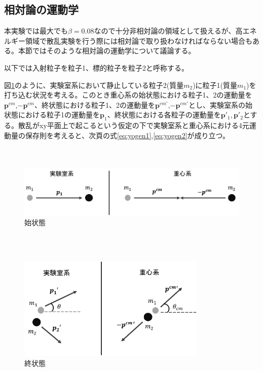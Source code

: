 \documentclass[a4paper,11pt,dvipdfmx]{jsarticle}
\begin{document}
\renewcommand\thefootnote{\arabic{footnote})}
\newpage
\subsection{相対論の運動学\cite{kyodai}}
本実験では最大でも$\beta=0.08$なので十分非相対論の領域として扱えるが、高エネルギー領域で散乱実験を行う際には相対論で取り扱わなければならない場合もある。本節ではそのような相対論の運動学について議論する。

以下では入射粒子を粒子1、標的粒子を粒子2と呼称する。

図\ref{fig:initial}のように、実験室系において静止している粒子2(質量$m_{2}$)に粒子1(質量$m_{1}$)を打ち込む状況を考える。このとき重心系の始状態における粒子1、2の運動量を$\bm{p}^{cm}$,$-\bm{p}^{cm}$、終状態における粒子1、2の運動量を$\bm{p}^{cm'}$,$-\bm{p}^{cm'}$とし、実験室系の始状態における粒子1の運動量を$\bm{p}_{1}$、終状態における各粒子の運動量を$\bm{p}'_{1}$,\,$\bm{p}'_{2}$とする。散乱がxy平面上で起こるという仮定の下で実験室系と重心系における4元運動量の保存則を考えると、次頁の式\eqref{eq:yogen1},\eqref{eq:yogen2}が成り立つ。
\\
\\
\\
\begin{figure}[htbp]
\centering
\includegraphics[width=12cm]{picture/relativity/initial.pdf}
\caption{始状態}
\label{fig:initial}
\end{figure}
\\
\\
\begin{figure}[htbp]
\centering
\includegraphics[width=9cm]{picture/relativity/final1.pdf}
\caption{終状態}
\label{fig:final}
\end{figure}
\newpage
\end{document}
